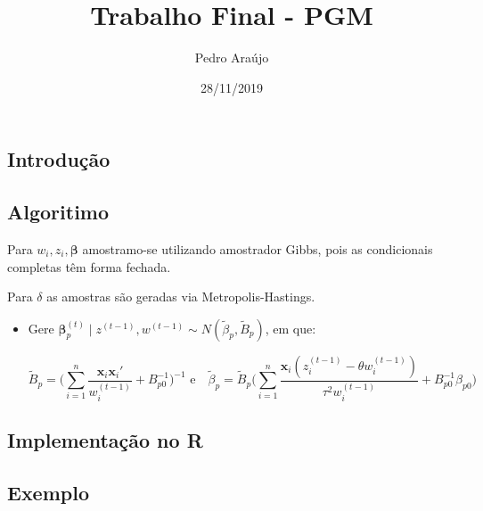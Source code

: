 \documentclass[]{article}
\title{Trabalho Final - PGM}
\author{Pedro Araújo}
\date{28/11/2019}
\begin{document}
\maketitle

\hypertarget{introduuxe7uxe3o}{%
\subsection{Introdução}\label{introduuxe7uxe3o}}

\hypertarget{algoritimo}{%
\subsection{Algoritimo}\label{algoritimo}}

Para \(w_i, z_i, \boldsymbol{\beta}\) amostramo-se utilizando amostrador
Gibbs, pois as condicionais completas têm forma fechada.

Para \(\delta\) as amostras são geradas via Metropolis-Hastings.

\begin{itemize}

\item Gere $\boldsymbol{\beta}_{p}^{(t)}\mid z^{(t-1)},w^{(t-1)} \sim N(\tilde{\beta}_p, \tilde{B}_p)$, em que:

$$\tilde{B}_p = \bigg(\sum_{i=1}^{n}\frac{\mathbf{x}_i\mathbf{x}_i'}{w_i^{(t-1)}} + B_{p0}^{-1}\bigg)^{-1} \text{ e }\:\:\: \tilde{\beta}_p = \tilde{B}_p\bigg(\sum_{i=1}^{n}\frac{\mathbf{x}_i(z_i^{(t-1)}-\theta w_i^{(t-1)})}{\tau^2w_i^{(t-1)}} + B_{p0}^{-1}\beta_{p0}\bigg)$$

\end{itemize}

\hypertarget{implementauxe7uxe3o-no-r}{%
\subsection{Implementação no R}\label{implementauxe7uxe3o-no-r}}

\hypertarget{exemplo}{%
\subsection{Exemplo}\label{exemplo}}
\end{document}
